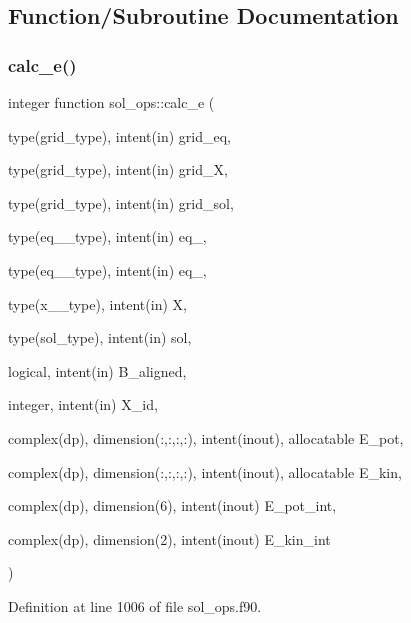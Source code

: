 \subsection{Function/\+Subroutine Documentation}
\mbox{\label{namespacesol__ops_aaeb4b122754fc6a4f538b22d72b6cba0}} 
\subsubsection{\texorpdfstring{calc\+\_\+e()}{calc\_e()}}
{\footnotesize\ttfamily integer function sol\+\_\+ops\+::calc\+\_\+e (\begin{DoxyParamCaption}\item[{type(grid\+\_\+type), intent(in)}]{grid\+\_\+eq,  }\item[{type(grid\+\_\+type), intent(in)}]{grid\+\_\+X,  }\item[{type(grid\+\_\+type), intent(in)}]{grid\+\_\+sol,  }\item[{type(eq\+\_\+1\+\_\+type), intent(in)}]{eq\+\_,  }\item[{type(eq\+\_\+2\+\_\+type), intent(in)}]{eq\+\_,  }\item[{type(x\+\_\+1\+\_\+type), intent(in)}]{X,  }\item[{type(sol\+\_\+type), intent(in)}]{sol,  }\item[{logical, intent(in)}]{B\+\_\+aligned,  }\item[{integer, intent(in)}]{X\+\_\+id,  }\item[{complex(dp), dimension(\+:,\+:,\+:,\+:), intent(inout), allocatable}]{E\+\_\+pot,  }\item[{complex(dp), dimension(\+:,\+:,\+:,\+:), intent(inout), allocatable}]{E\+\_\+kin,  }\item[{complex(dp), dimension(6), intent(inout)}]{E\+\_\+pot\+\_\+int,  }\item[{complex(dp), dimension(2), intent(inout)}]{E\+\_\+kin\+\_\+int }\end{DoxyParamCaption})}



Definition at line 1006 of file sol\+\_\+ops.\+f90.

